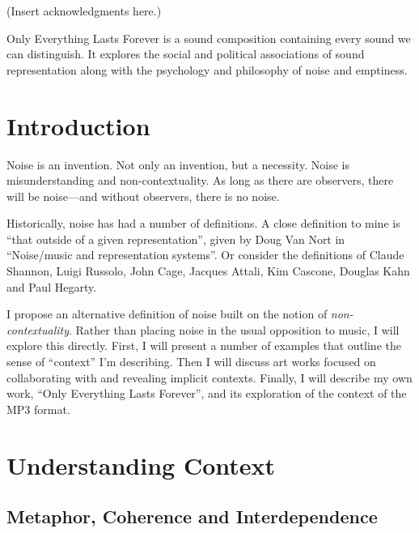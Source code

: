 \documentclass{thesis}
\author{Kyle McDonald}
\begin{document}
 
\titlepage
\tableofcontents


(Insert acknowledgments here.)


Only Everything Lasts Forever is a sound composition containing every sound we can distinguish. It explores the social and political associations of sound representation along with the psychology and philosophy of noise and emptiness.

\chapter{Introduction}

Noise is an invention. Not only an invention, but a necessity. Noise is misunderstanding and non-contextuality. As long as there are observers, there will be noise---and without observers, there is no noise.

Historically, noise has had a number of definitions. A close definition to mine is ``that outside of a given representation'', given by Doug Van Nort in ``Noise/music and representation systems''\cite{Vannort06}. Or consider the definitions of Claude Shannon, Luigi Russolo\cite{Russolo04}, John Cage\cite{Cage61}, Jacques Attali\cite{Attali85}, Kim Cascone\cite{Cascone00}, Douglas Kahn\cite{Kahn01} and Paul Hegarty\cite{Hegarty02}.

I propose an alternative definition of noise built on the notion of \emph{non-contextuality}. Rather than placing noise in the usual opposition to music, I will explore this directly. First, I will present a number of examples that outline the sense of ``context'' I'm describing. Then I will discuss art works focused on collaborating with and revealing implicit contexts. Finally, I will describe my own work, ``Only Everything Lasts Forever'', and its exploration of the context of the MP3 format.

\chapter{Understanding Context}

\section{Metaphor, Coherence and Interdependence}
\end{document}
